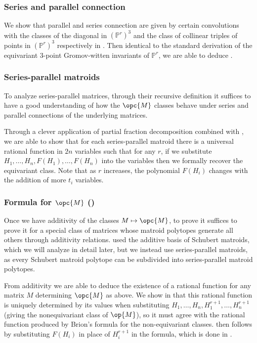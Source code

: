 \documentclass[12pt]{amsart}
\newcommand{\mb}{\mathbb}
\theoremstyle{plain}
\theoremstyle{definition}
\theoremstyle{remark}
\begin{document}
\subsubsection{Series and parallel connection}
We show that parallel and series connection are given by certain convolutions with the classes of the diagonal in $(\mb{P}^r)^3$ and the class of collinear triples of points in $(\mb{P}^r)^3$ respectively in . Then identical to the standard derivation of the equivariant $3$-point Gromov-witten invariants of $\mb{P}^r$, we are able to deduce .

\subsubsection{Series-parallel matroids}
To analyze series-parallel matrices, through their recursive definition it suffices to have a good understanding of how the $\opc{M}$ classes behave under series and parallel connections of the underlying matrices. 

Through a clever application of partial fraction decomposition combined with , we are able to show that for each series-parallel matroid there is a universal rational function in $2n$ variables such that for any $r$, if we substitute $H_1,\ldots,H_n,F(H_1),\ldots,F(H_n)$ into the variables then we formally recover the equivariant class. Note that as $r$ increases, the polynomial $F(H_i)$ changes with the addition of more $t_i$ variables.

\subsubsection{Formula for $\opc{M}$ ()}

Once we have additivity of the classes $M \mapsto \opc{M}$, to prove  it suffices to prove it for a special class of matrices whose matroid polytopes generate all others through additivity relations. \cite{Derksen} used the additive basis of Schubert matroids, which we will analyze in detail later, but we instead use series-parallel matroids, as every Schubert matroid polytope can be subdivided into series-parallel matroid polytopes.

From additivity we are able to deduce the existence of a rational function for any matrix $M$ determining $\opc{M}$ as above. We show in  that this rational function is uniquely determined by its values when substituting $H_1,\ldots,H_n,H_1^{r+1},\ldots,H_n^{r+1}$ (giving the nonequivariant class of $\op{M}$), so it must agree with the rational function produced by Brion's formula for the non-equivariant classes.  then follows by substituting $F(H_i)$ in place of $H_i^{r+1}$ in the formula, which is done in .
\end{document}
